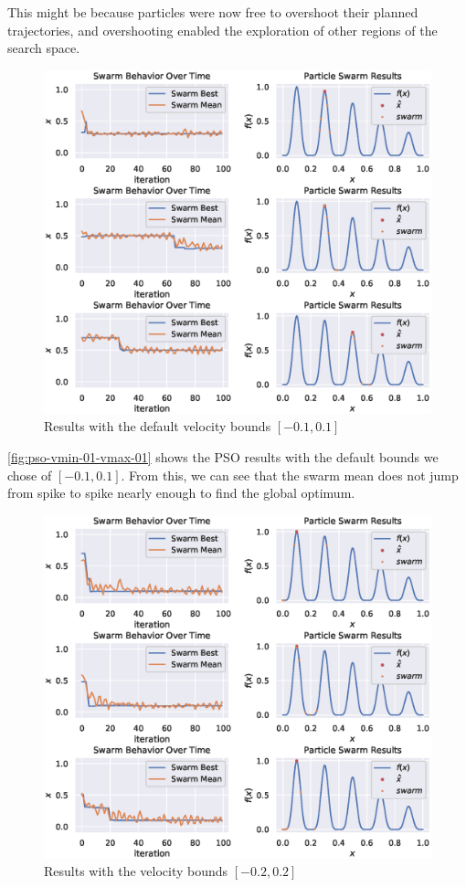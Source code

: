 \documentclass[12pt]{article}
\begin{document}
This might be because particles were now free to overshoot their planned trajectories, and overshooting enabled the exploration of other regions of the search space.

\begin{figure}[H]
    \centering
    \includegraphics[width=\textwidth]{figures/pso-v01.eps}
    \caption{Results with the default velocity bounds $[-0.1, 0.1]$}\label{fig:pso-vmin-01-vmax-01}
\end{figure}

\autoref{fig:pso-vmin-01-vmax-01} shows the PSO results with the default bounds we chose of $[-0.1, 0.1]$.
From this, we can see that the swarm mean does not jump from spike to spike nearly enough to find the global optimum.

\begin{figure}[H]
    \centering
    \includegraphics[width=\textwidth]{figures/pso-v021.eps}
    \caption{Results with the velocity bounds $[-0.2, 0.2]$}\label{fig:pso-vmin-02-vmax-02}
\end{figure}
\end{document}
